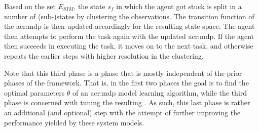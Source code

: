 Based on the set $E_\mathit{SIM}$, the state $s_f$ in which the agent got stuck is split in a number of (sub-)states by clustering the observations.
The transition function of the \acrshort{acr:mdp} is then updated accordingly for the resulting state space.
The agent then attempts to perform the task again with the updated \acrshort{acr:mdp}.
If the agent then succeeds in executing the task, it moves on to the next task, and otherwise repeats the earlier steps with higher resolution in the clustering.

Note that this third phase is a phase that is mostly independent of the prior phases of the framework.
That is, in the first two phases the goal is to find the optimal parameters $\theta$ of an \acrshort{acr:mdp} model learning algorithm, while the third phase is concerned with tuning the resulting .
As such, this last phase is rather an additional (and optional) step with the attempt of further improving the performance yielded by these system models.






